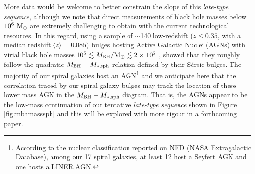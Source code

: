 \documentclass[preprint2]{emulateapj}
\begin{document}
More data would be welcome to better constrain the slope of this \emph{late-type sequence}, 
although we note that direct measurements of black hole masses below $10^6\rm~M_\odot$ are extremely challenging to obtain 
with the current technological resources. 
In this regard, using a sample of $\sim$140 low-redshift ($z \leq 0.35$, with a median redshift $\langle z \rangle = 0.085$) 
bulges hosting Active Galactic Nuclei (AGNs) with virial
black hole masses $10^5 \lesssim M_{\rm BH}/{\rm M_\odot} \lesssim 2 \times 10^6$ \citep{jiang2011a}, 
\cite{grahamscott2015} showed that they roughly follow the quadratic $M_{\rm BH} - M_{\rm *,sph}$ relation defined by their S\'ersic bulges.
The majority of our spiral galaxies host an AGN\footnote{According to the nuclear classification reported on NED 
(NASA Extragalactic Database), among our 17 spiral galaxies, at least 12 host a Seyfert AGN and one hosts a LINER AGN.} and
we anticipate here that the correlation traced by our spiral galaxy bulges 
may track the location of these lower mass AGN in the $M_{\rm BH} - M_{\rm *,sph}$ diagram.
That is, the AGNs appear to be the low-mass continuation of our tentative \emph{late-type sequence} shown in Figure \ref{fig:mbhmasssph} 
and this will be explored with more rigour in a forthcoming paper. 
 
\end{document}
